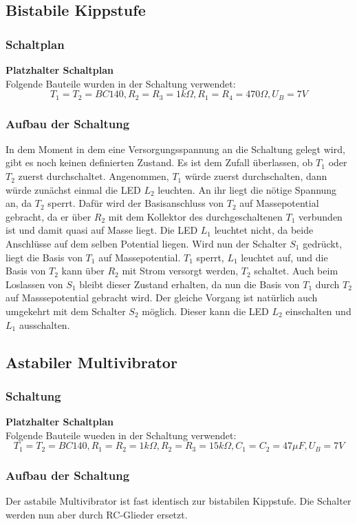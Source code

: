 \documentclass[
a4paper,     %
 headsepline, %
11pt         %
]{scrartcl}  %
\begin{document}
\subsection{Bistabile Kippstufe}
\subsubsection*{Schaltplan}
\textbf{Platzhalter Schaltplan} \\
Folgende Bauteile wurden in der Schaltung verwendet:
\[T_1=T_2=BC140, R_2=R_3=1k\Omega, R_1=R_4=470\Omega, U_B=7V\]
\subsubsection*{Aufbau der Schaltung}
In dem Moment in dem eine Versorgungsspannung an die Schaltung gelegt wird, gibt es noch keinen definierten Zustand. Es ist dem Zufall überlassen, ob $T_1$ oder $T_2$ zuerst durchschaltet. Angenommen, $T_1$ würde zuerst durchschalten, dann würde zunächst einmal die LED $L_2$ leuchten. An ihr liegt die nötige Spannung an, da $T_2$ sperrt. Dafür wird der Basisanschluss von $T_2$ auf Massepotential gebracht, da er über $R_2$ mit dem Kollektor des durchgeschaltenen $T_1$ verbunden ist und damit quasi auf Masse liegt. Die LED $L_1$ leuchtet nicht, da beide Anschlüsse auf dem selben Potential liegen. Wird nun der Schalter $S_1$ gedrückt, liegt die Basis von $T_1$ auf Massepotential. $T_1$ sperrt, $L_1$ leuchtet auf, und die Basis von $T_2$ kann über $R_2$ mit Strom versorgt werden, $T_2$ schaltet. Auch beim Loslassen von $S_1$ bleibt dieser Zustand erhalten, da nun die Basis von $T_1$ durch $T_2$ auf Masssepotential gebracht wird.
Der gleiche Vorgang ist natürlich auch umgekehrt mit dem Schalter $S_2$ möglich. Dieser kann die LED $L_2$ einschalten und $L_1$ ausschalten.

\subsection{Astabiler Multivibrator}
\subsubsection{Schaltung}
\textbf{Platzhalter Schaltplan} \\
Folgende Bauteile wueden in der Schaltung verwendet: 
\[T_1=T_2=BC140, R_1=R_2=1k\Omega, R_2=R_3=15k\Omega, C_1=C_2=47\mu F, U_B=7V\]
\subsubsection{Aufbau der Schaltung}
Der astabile Multivibrator ist fast identisch zur bistabilen Kippstufe. Die Schalter werden nun aber durch RC-Glieder ersetzt.
\end{document}
